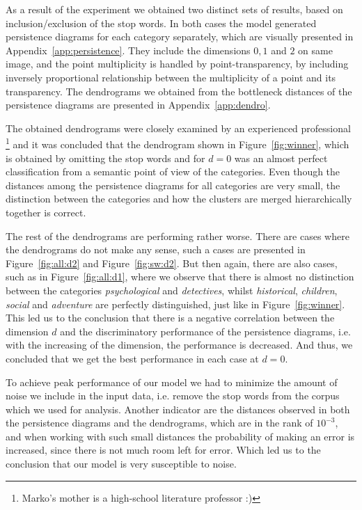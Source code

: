 \documentclass[fleqn]{article}
\begin{document}
As a result of the experiment we obtained two distinct sets of results, based on inclusion/exclusion of the stop words. In both cases the model generated persistence diagrams for each category separately, which are visually presented in Appendix~\ref{app:persistence}. They include the dimensions $0, 1$ and $2$ on same image, and the point multiplicity is handled by point-transparency, by including inversely proportional relationship between the multiplicity of a point and its transparency.
The dendrograms we obtained from the bottleneck distances of the persistence diagrams are presented in Appendix~\ref{app:dendro}.

The obtained dendrograms were closely examined by an experienced professional \footnote{Marko's mother is a high-school literature professor :)} and it was concluded that the dendrogram shown in Figure~\ref{fig:winner}, which is obtained by omitting the stop words and for $d = 0$ was an almost perfect classification from a semantic point of view of the categories. Even though the distances among the persistence diagrams for all categories are very small, the distinction between the categories and how the clusters are merged hierarchically together is correct.

The rest of the dendrograms are performing rather worse. There are cases where the dendrograms do not make any sense, such a cases are presented in Figure~\ref{fig:all:d2} and Figure~\ref{fig:sw:d2}. But then again, there are also cases, such as in Figure~\ref{fig:all:d1}, where we observe that there is almost no distinction between the categories \textit{psychological} and \textit{detectives}, whilst \textit{historical}, \textit{children}, \textit{social} and \textit{adventure} are perfectly distinguished, just like in Figure~\ref{fig:winner}. This led us to the conclusion that there is a negative correlation between the dimension $d$ and the discriminatory performance of the persistence diagrams, i.e. with the increasing of the dimension, the performance is decreased. And thus, we concluded that we get the best performance in each case at $d = 0$.

To achieve peak performance of our model we had to minimize the amount of noise we include in the input data, i.e. remove the stop words from the corpus which we used for analysis. Another indicator are the distances observed in both the persistence diagrams and the dendrograms, which are in the rank of $10^{-3}$, and when working with such small distances the probability of making an error is increased, since there is not much room left for error. Which led us to the conclusion that our model is very susceptible to noise.
\end{document}
